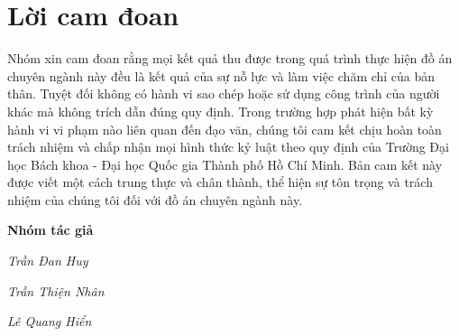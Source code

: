 \section*{Lời cam đoan}
\thispagestyle{empty}

\hspace*{0.5cm} Nhóm xin cam đoan rằng mọi kết quả thu được trong quá trình thực hiện đồ án chuyên ngành này đều là kết quả của sự nỗ lực và làm việc chăm chỉ của bản thân. Tuyệt đối không có hành vi sao chép hoặc sử dụng công trình của người khác mà không trích dẫn đúng quy định. Trong trường hợp phát hiện bất kỳ hành vi vi phạm nào liên quan đến đạo văn, chúng tôi cam kết chịu hoàn toàn trách nhiệm và chấp nhận mọi hình thức kỷ luật theo quy định của Trường Đại học Bách khoa - Đại học Quốc gia Thành phố Hồ Chí Minh. Bản cam kết này được viết một cách trung thực và chân thành, thể hiện sự tôn trọng và trách nhiệm của chúng tôi đối với đồ án chuyên ngành này.
\par\hfill\textbf{Nhóm tác giả}\hspace{1cm}
\par\hfill\textit{Trần Đan Huy}\hspace{1cm}
\par\hfill\textit{Trần Thiện Nhân}\hspace{1cm}
\par\hfill\textit{Lê Quang Hiển}\hspace{1cm}
\clearpage
{}
